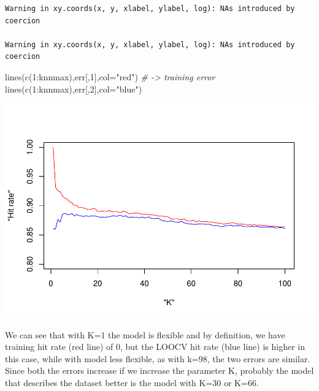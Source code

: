 \documentclass[
  11pt,
]{article}
\newenvironment{Shaded}{\begin{snugshade}}{\end{snugshade}}
\newcommand{\AttributeTok}[1]{\textcolor[rgb]{0.77,0.63,0.00}{#1}}
\newcommand{\CommentTok}[1]{\textcolor[rgb]{0.56,0.35,0.01}{\textit{#1}}}
\newcommand{\DecValTok}[1]{\textcolor[rgb]{0.00,0.00,0.81}{#1}}
\newcommand{\FunctionTok}[1]{\textcolor[rgb]{0.00,0.00,0.00}{#1}}
\newcommand{\NormalTok}[1]{#1}
\newcommand{\SpecialCharTok}[1]{\textcolor[rgb]{0.00,0.00,0.00}{#1}}
\newcommand{\StringTok}[1]{\textcolor[rgb]{0.31,0.60,0.02}{#1}}
\begin{document}
\begin{verbatim}
Warning in xy.coords(x, y, xlabel, ylabel, log): NAs introduced by coercion

Warning in xy.coords(x, y, xlabel, ylabel, log): NAs introduced by coercion
\end{verbatim}

\begin{Shaded}
\begin{Highlighting}[]
\FunctionTok{lines}\NormalTok{(}\FunctionTok{c}\NormalTok{(}\DecValTok{1}\SpecialCharTok{:}\NormalTok{knnmax),err[,}\DecValTok{1}\NormalTok{],}\AttributeTok{col=}\StringTok{"red"}\NormalTok{) }\CommentTok{\# {-}\textgreater{} training error}
\FunctionTok{lines}\NormalTok{(}\FunctionTok{c}\NormalTok{(}\DecValTok{1}\SpecialCharTok{:}\NormalTok{knnmax),err[,}\DecValTok{2}\NormalTok{],}\AttributeTok{col=}\StringTok{"blue"}\NormalTok{)}
\end{Highlighting}
\end{Shaded}

\includegraphics{1_Task_files/figure-latex/Task_1_10-1.pdf}

We can see that with K=1 the model is flexible and by definition, we have training hit rate (red line) of 0, but the LOOCV hit rate (blue line) is higher in this case, while with model less flexible, as with k=98, the two errors are similar.
Since both the errors increase if we increase the parameter K, probably the model that describes the dataset better is the model with K=30 or K=66.
\end{document}
